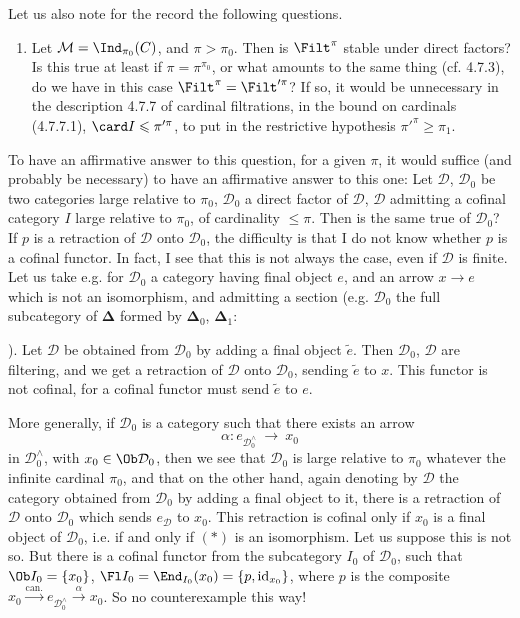Let us also note for the record the following questions.
\begin{enumerate}
\item[3)] Let $\mathcal{M}=\Ind_{\pi_0}(C)$, and $\pi>\pi_0$. Then is $\Filt^\pi$ stable under direct factors? Is this true at least if $\pi=\pi^{\pi_0}$, or what amounts to the same thing (cf. 4.7.3), do we have in this case $\Filt^\pi=\Filt'^{\pi}$? If so, it would be unnecessary in the description 4.7.7 of cardinal filtrations, in the bound on cardinals (4.7.7.1), $\card I\leqslant\pi'^{\pi}$, to put in the restrictive hypothesis $\pi'^{\pi}\geqslant\pi_1$.
\end{enumerate}

To have an affirmative answer to this question, for a given $\pi$, it would suffice (and probably be necessary) to have an affirmative answer to this one: Let $\mathcal{D}$, $\mathcal{D}_0$ be two categories large relative to $\pi_0$, $\mathcal{D}_0$ a direct factor of $\mathcal{D}$, $\mathcal{D}$ admitting a cofinal category $I$ large relative to $\pi_0$, of cardinality $\leqslant\pi$. Then is the same true of $\mathcal{D}_0$? If $p$ is a retraction of $\mathcal{D}$ onto $\mathcal{D}_0$, the difficulty is that I do not know whether $p$ is a cofinal functor. In fact, I see that
this is not always the case, even if $\mathcal{D}$ is finite. Let us take e.g. for $\mathcal{D}_0$ a category having final object $e$, and an arrow $x\longrightarrow e$ which is not an isomorphism, and admitting a section (e.g. $\mathcal{D}_0$ the full subcategory of $\boldsymbol{\Delta}$ formed by $\boldsymbol{\Delta}_0$, $\boldsymbol{\Delta}_1$:  ). Let $\mathcal{D}$ be obtained from $\mathcal{D}_0$ by adding a final object $\tilde{e}$. Then $\mathcal{D}_0$, $\mathcal{D}$ are filtering, and we get a retraction of $\mathcal{D}$ onto $\mathcal{D}_0$, sending $\tilde{e}$ to $x$. This functor is not cofinal, for a cofinal functor must send $\tilde{e}$ to $e$.

More generally, if $\mathcal{D}_0$ is a category such that there exists an arrow
\[
\alpha : e_{\mathcal{D}_0^\wedge} \ \longrightarrow \ x_0 \tag*{$(*)$}
\]
in $\mathcal{D}_0^\wedge$, with $x_0\in\Ob\mathcal{D}_0$, then we see that $\mathcal{D}_0$ is large relative to $\pi_0$ whatever the infinite cardinal $\pi_0$, and that on the other hand, again denoting by $\mathcal{D}$ the category obtained from $\mathcal{D}_0$ by adding a final object to it, there is a retraction of $\mathcal{D}$ onto $\mathcal{D}_0$ which sends $e_{\mathcal{D}}$ to $x_0$. This retraction is cofinal only if $x_0$ is a final object of $\mathcal{D}_0$, i.e. if and only if $(*)$ is an isomorphism. Let us suppose this is not so. But there is a cofinal functor from the subcategory $I_0$ of $\mathcal{D}_0$, such that $\Ob I_0=\{x_0\}$, $\Fl I_0=\End_{I_0}(x_0)=\{p,\mathrm{id}_{x_0}\}$, where $p$ is the composite $x_0\xrightarrow{\text{can.}}e_{\mathcal{D}_0^\wedge}\xrightarrow{\alpha}x_0$. So no counterexample this way!

